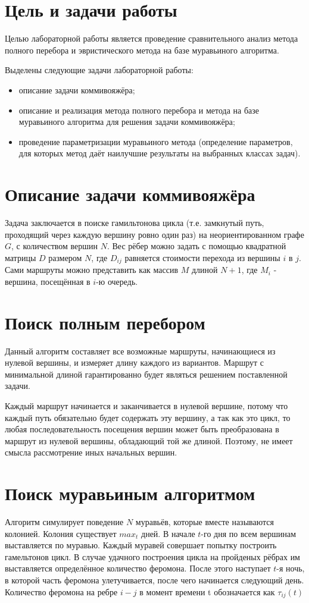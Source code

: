 \section{Цель и задачи работы}
Целью лабораторной работы является проведение сравнительного анализ метода полного перебора и эвристического метода на базе муравьиного алгоритма.

Выделены следующие задачи лабораторной работы:

\begin{itemize}
\item описание задачи коммивояжёра;
\item описание и реализация метода полного перебора и метода на базе муравьиного алгоритма для решения задачи коммивояжёра;
\item проведение параметризации муравьиного метода (определение параметров, для которых метод даёт наилучшие результаты на выбранных классах задач).
\end{itemize}

\section{Описание задачи коммивояжёра}
Задача заключается в поиске гамильтонова цикла (т.е. замкнутый путь, проходящий через каждую вершину ровно один раз) на неориентированном графе $G$, с количеством вершин $N$\cite{Corman}. Вес рёбер можно задать с помощью квадратной матрицы $D$ размером $N$, где $D_{ij}$ равняется стоимости перехода из вершины $i$ в $j$. Сами маршруты можно представить как массив $M$ длиной $N+1$, где $M_{i}$ - вершина, посещённая в $i$-ю очередь.

\section{Поиск полным перебором}
Данный алгоритм составляет все возможные маршруты, начинающиеся из нулевой вершины, и измеряет длину каждого из вариантов. Маршрут с минимальной длиной гарантированно будет являться решением поставленной задачи. 

Каждый маршрут начинается и заканчивается в нулевой вершине, потому что каждый путь обязательно будет содержать эту вершину, а так как это цикл, то любая последовательность посещения вершин может быть преобразована в маршрут из нулевой вершины, обладающий той же длиной. Поэтому, не имеет смысла рассмотрение иных начальных вершин.

\section{Поиск муравьиным алгоритмом}
Алгоритм симулирует поведение $N$ муравьёв, которые вместе называются колонией. Колония существует $max_t$ дней. В начале $t$-го дня по всем вершинам выставляется по муравью. Каждый муравей совершает попытку построить гамельтонов цикл. В случае удачного построения цикла на пройденых рёбрах им выставляется определённое количество феромона. После этого наступает $t$-я ночь, в которой часть феромона улетучивается, после чего начинается следующий день. Количество феромона на ребре $i-j$ в момент времени t обозначается как $\tau_{ij}(t)$


